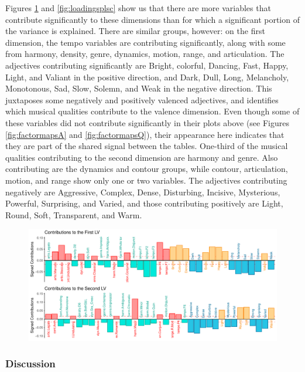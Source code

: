 \documentclass[
  english,
  man,floatsintext]{apa6}
\begin{document}
Figures \ref{fig:contsplsc} and \ref{fig:loadingsplsc} show us that there are more variables that contribute significantly to these dimensions than for which a significant portion of the variance is explained. There are similar groups, however: on the first dimension, the tempo variables are contributing significantly, along with some from harmony, density, genre, dynamics, motion, range, and articulation. The adjectives contributing significantly are Bright, colorful, Dancing, Fast, Happy, Light, and Valiant in the positive direction, and Dark, Dull, Long, Melancholy, Monotonous, Sad, Slow, Solemn, and Weak in the negative direction. This juxtaposes some negatively and positively valenced adjectives, and identifies which musical qualities contribute to the valence dimension. Even though some of these variables did not contribute significantly in their plots above (see Figures \ref{fig:factormapsA} and \ref{fig:factormapsQ}), their appearance here indicates that they are part of the shared signal between the tables.
One-third of the musical qualities contributing to the second dimension are harmony and genre. Also contributing are the dynamics and contour groups, while contour, articulation, motion, and range show only one or two variables. The adjectives contributing negatively are Aggressive, Complex, Dense, Disturbing, Incisive, Mysterious, Powerful, Surprising, and Varied, and those contributing positively are Light, Round, Soft, Transparent, and Warm.

\begin{figure}

{\centering \includegraphics{Music-Descriptor-Space_files/figure-latex/contsplsc-1} 

}

\caption{ }\label{fig:contsplsc}
\end{figure}

\hypertarget{discussion-2}{%
\subsubsection{Discussion}\label{discussion-2}}
\end{document}
